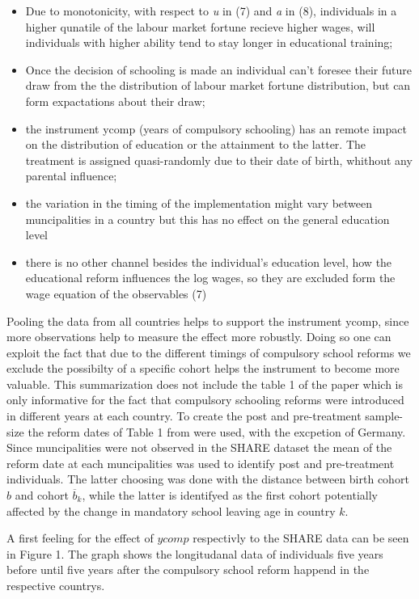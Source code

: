 \documentclass[12pt,a4paper]{article}
\begin{document}
\begin{itemize}
\item Due to monotonicity, with respect to \textit{u} in (7) and \textit{a} in (8), individuals in a higher qunatile of the labour market fortune recieve higher wages, will individuals with higher ability tend to stay longer in educational training;
\item Once the decision of schooling is made an individual can't foresee their future draw from the the distribution of labour market fortune distribution, but can form expactations about their draw;
\item the instrument ycomp (years of compulsory schooling) has an remote impact on the distribution of education or the attainment to the latter. The treatment is assigned quasi-randomly due to their date of birth, whithout any parental influence;
\item the variation in the timing of the implementation might vary between muncipalities in a country but this has no effect on the general education level
\item there is no other channel besides the individual's education level, how the educational reform influences the log wages, so they are excluded form the wage equation of the observables (7)
\end{itemize}

Pooling the data from all countries helps to support the instrument
ycomp, since more observations help to measure the effect more robustly.
Doing so one can exploit the fact that due to the different timings of
compulsory school reforms we exclude the possibilty of a specific cohort
helps the instrument to become more valuable. This summarization does
not include the table 1 of the paper which is only informative for the
fact that compulsory schooling reforms were introduced in different
years at each country. To create the post and pre-treatment sample-size
the reform dates of Table 1 from \textcite{brunello} were used, with the
excpetion of Germany. Since muncipalities were not observed in the SHARE
dataset the mean of the reform date at each muncipalities was used to
identify post and pre-treatment individuals. The latter choosing was
done with the distance between birth cohort \(b\) and cohort
\(\overline{b}_k\), while the latter is identifyed as the first cohort
potentially affected by the change in mandatory school leaving age in
country \(k\).

A first feeling for the effect of \(ycomp\) respectivly to the SHARE
data can be seen in Figure 1. The graph shows the longitudanal data of
individuals five years before until five years after the compulsory
school reform happend in the respective countrys.
\end{document}
